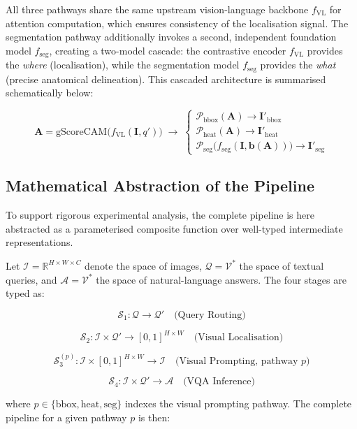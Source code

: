 All three pathways share the same upstream vision-language backbone $f_{\text{VL}}$ for attention computation, which ensures consistency of the localisation signal. The segmentation pathway additionally invokes a second, independent foundation model $f_{\text{seg}}$, creating a two-model cascade: the contrastive encoder $f_{\text{VL}}$ provides the \textit{where} (localisation), while the segmentation model $f_{\text{seg}}$ provides the \textit{what} (precise anatomical delineation). This cascaded architecture is summarised schematically below:

\[
\mathbf{A} = \text{gScoreCAM}\!\bigl(f_{\text{VL}}(\mathbf{I}, q')\bigr) \;\longrightarrow\; \begin{cases} \mathcal{P}_{\text{bbox}}(\mathbf{A}) \to \mathbf{I}'_{\text{bbox}} \\[4pt] \mathcal{P}_{\text{heat}}(\mathbf{A}) \to \mathbf{I}'_{\text{heat}} \\[4pt] \mathcal{P}_{\text{seg}}\!\bigl(f_{\text{seg}}(\mathbf{I}, \mathbf{b}(\mathbf{A}))\bigr) \to \mathbf{I}'_{\text{seg}} \end{cases}
\]

\subsection{Mathematical Abstraction of the Pipeline}
\label{sec:3_1_4}

To support rigorous experimental analysis, the complete pipeline is here abstracted as a parameterised composite function over well-typed intermediate representations.

Let $\mathcal{I} = \mathbb{R}^{H \times W \times C}$ denote the space of images, $\mathcal{Q} = \mathcal{V}^*$ the space of textual queries, and $\mathcal{A} = \mathcal{V}^*$ the space of natural-language answers. The four stages are typed as:

\[
\mathcal{S}_1 : \mathcal{Q} \to \mathcal{Q}' \quad \text{(Query Routing)}
\]

\[
\mathcal{S}_2 : \mathcal{I} \times \mathcal{Q}' \to [0, 1]^{H \times W} \quad \text{(Visual Localisation)}
\]

\[
\mathcal{S}_3^{(p)} : \mathcal{I} \times [0, 1]^{H \times W} \to \mathcal{I} \quad \text{(Visual Prompting, pathway } p \text{)}
\]

\[
\mathcal{S}_4 : \mathcal{I} \times \mathcal{Q}' \to \mathcal{A} \quad \text{(VQA Inference)}
\]

where $p \in \{\text{bbox}, \text{heat}, \text{seg}\}$ indexes the visual prompting pathway. The complete pipeline for a given pathway $p$ is then:

